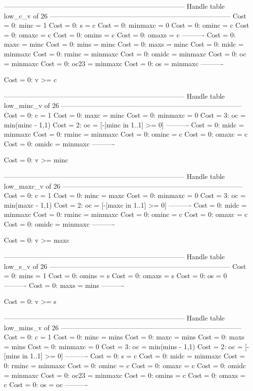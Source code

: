 --------------------------------------------------------------------------------
Handle table low_c_v of 26
--------------------------------------------------------------------------------
Cost =  0:  minc    = 1
Cost =  0:  s       = c
Cost =  0:  minmaxc = 0
Cost =  0:  ominc   = c
Cost =  0:  omaxc   = c
Cost =  0:  omins   = c
Cost =  0:  omaxs   = c
----------
Cost =  0:  maxc    = minc
Cost =  0:  mins    = minc
Cost =  0:  maxs    = minc
Cost =  0:  midc    = minmaxc
Cost =  0:  rminc   = minmaxc
Cost =  0:  omidc   = minmaxc
Cost =  0:  oc      = minmaxc
Cost =  0:  oc23    = minmaxc
Cost =  0:  os      = minmaxc
----------

Cost =  0:  v >= c

--------------------------------------------------------------------------------
Handle table low_minc_v of 26
--------------------------------------------------------------------------------
Cost =  0:  c       = 1
Cost =  0:  maxc    = minc
Cost =  0:  minmaxc = 0
Cost =  3:  oc      = min(minc - 1,1)
Cost =  2:  oc      = [-[minc in 1..1] >= 0]
----------
Cost =  0:  midc    = minmaxc
Cost =  0:  rminc   = minmaxc
Cost =  0:  ominc   = c
Cost =  0:  omaxc   = c
Cost =  0:  omidc   = minmaxc
----------

Cost =  0:  v >= minc

--------------------------------------------------------------------------------
Handle table low_maxc_v of 26
--------------------------------------------------------------------------------
Cost =  0:  c       = 1
Cost =  0:  minc    = maxc
Cost =  0:  minmaxc = 0
Cost =  3:  oc      = min(maxc - 1,1)
Cost =  2:  oc      = [-[maxc in 1..1] >= 0]
----------
Cost =  0:  midc    = minmaxc
Cost =  0:  rminc   = minmaxc
Cost =  0:  ominc   = c
Cost =  0:  omaxc   = c
Cost =  0:  omidc   = minmaxc
----------

Cost =  0:  v >= maxc

--------------------------------------------------------------------------------
Handle table low_s_v of 26
--------------------------------------------------------------------------------
Cost =  0:  mins  = 1
Cost =  0:  omins = s
Cost =  0:  omaxs = s
Cost =  0:  os    = 0
----------
Cost =  0:  maxs  = mins
----------

Cost =  0:  v >= s

--------------------------------------------------------------------------------
Handle table low_mins_v of 26
--------------------------------------------------------------------------------
Cost =  0:  c       = 1
Cost =  0:  minc    = mins
Cost =  0:  maxc    = mins
Cost =  0:  maxs    = mins
Cost =  0:  minmaxc = 0
Cost =  3:  oc      = min(mins - 1,1)
Cost =  2:  oc      = [-[mins in 1..1] >= 0]
----------
Cost =  0:  s       = c
Cost =  0:  midc    = minmaxc
Cost =  0:  rminc   = minmaxc
Cost =  0:  ominc   = c
Cost =  0:  omaxc   = c
Cost =  0:  omidc   = minmaxc
Cost =  0:  oc23    = minmaxc
Cost =  0:  omins   = c
Cost =  0:  omaxs   = c
Cost =  0:  os      = oc
----------

